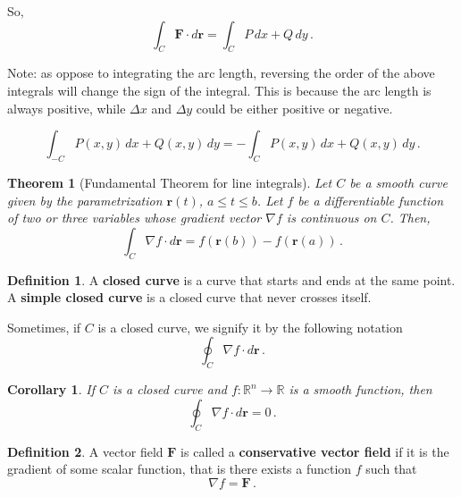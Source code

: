 \documentclass[
]{article}
\newtheorem{theorem}{Theorem}[section]
\newtheorem{corollary}{Corollary}[section]
\theoremstyle{definition}
\newtheorem{definition}{Definition}[section]
\theoremstyle{definition}
\theoremstyle{definition}
\theoremstyle{definition}
\theoremstyle{remark}
\begin{document}
So,
\begin{equation*}
    \int_C \mathbf{F} \cdot d \mathbf{r} 
    = \int_C P \, dx + Q \, dy \,.
\end{equation*}

Note: as oppose to integrating the arc length, reversing the order of the above integrals
will change the sign of the integral.
This is because the arc length is always positive, while \(\Delta x\) and \(\Delta y\) could be either positive
or negative.

\begin{equation*}
\int_{-C} P(x,y) \, dx + Q(x,y) \, dy 
= -\int_C P(x,y) \, dx + Q(x,y) \, dy \,.
\end{equation*}

\begin{theorem}[Fundamental Theorem for line integrals]
Let \(C\) be a smooth curve given by the parametrization \(\mathbf{r}(t)\),
\(a \leq t \leq b\).
Let \(f\) be a differentiable function of two or three
variables whose gradient vector \(\nabla f\) is continuous on \(C\).
Then,
\begin{equation*}
    \int_C \nabla f \cdot d\mathbf{r} = f(\mathbf{r}(b)) - f(\mathbf{r}(a)) \,.
\end{equation*}
\end{theorem}

\begin{definition}
A \textbf{closed curve} is a curve that starts and ends at the same point.
A \textbf{simple closed curve} is a closed curve that never crosses itself.
\end{definition}

Sometimes, if \(C\) is a closed curve, we signify it by the following notation
\begin{equation*}
    \oint_C \nabla f \cdot d\mathbf{r} \,.
\end{equation*}

\begin{corollary}
If \(C\) is a closed curve and \(f:\mathbb{R}^n \to \mathbb{R}\) is a smooth function,
then
\begin{equation*}
    \oint_C \nabla f \cdot d\mathbf{r}  = 0 \,.
\end{equation*}
\end{corollary}

\begin{definition}
A vector field \(\mathbf{F}\) is called a \textbf{conservative vector field}
if it is the gradient of some scalar function, that is there exists
a function \(f\) such that
\begin{equation*}
    \nabla f = \mathbf{F} \,.
\end{equation*}
\end{definition}
\end{document}
